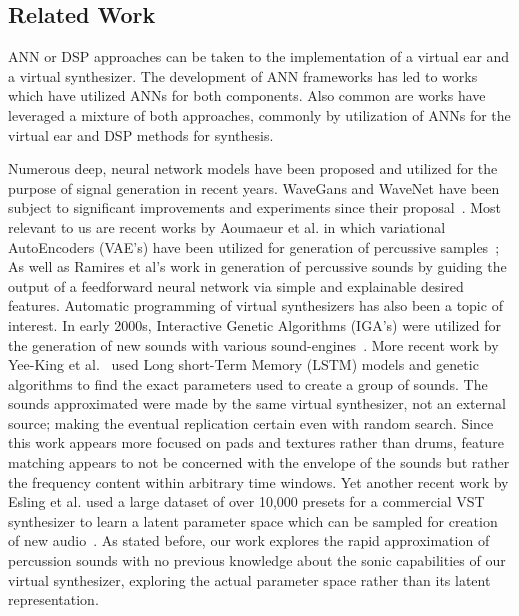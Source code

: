 \documentclass[\main/thesis.tex]{subfiles}
\begin{document}
\subsection{Related Work}
ANN or DSP approaches can be taken to the implementation of a virtual ear and a virtual synthesizer. The development of ANN frameworks has led to works which have utilized ANNs for both components. Also common are works have leveraged a mixture of both approaches, commonly by utilization of ANNs for the virtual ear and DSP methods for synthesis.

\begin{center}
\begin{table}[h*]
\caption{for reference, will delete} %
\end{table}
\end{center}
Numerous deep, neural network models have been proposed and utilized for the purpose of signal generation in recent years. WaveGans and WaveNet have been subject to significant improvements and experiments since their proposal~\cite{nsynth2017,yamamoto2020parallel,oord2017parallel}. Most relevant to us are recent works by Aoumaeur et al. in which variational AutoEncoders (VAE's) have been utilized for generation of percussive samples~\cite{aouameur2019neural}; As well as Ramires et al's work in generation of percussive sounds by guiding the output of a feedforward neural network via simple and explainable desired features. 
Automatic programming of virtual synthesizers has also been a topic of interest. In early 2000s, Interactive Genetic Algorithms (IGA's) were utilized for the generation of new sounds with various sound-engines~\cite{johnson1999exploring,dahlstedt2001creating}. More recent work by Yee-King et al.~\cite{yee2018automatic} used Long short-Term Memory (LSTM) models and genetic algorithms to find the exact parameters used to create a group of sounds. The sounds approximated were made by the same virtual synthesizer, not an external source; making the eventual replication certain even with random search. Since this work appears more focused on pads and textures rather than drums, feature matching appears to not be concerned with the envelope of the sounds but rather the frequency content within arbitrary time windows. Yet another recent work by Esling et al. used a large dataset of over 10,000 presets for a commercial VST synthesizer to learn a latent parameter space which can be sampled for creation of new audio~\cite{esling2019universal}. As stated before, our work explores the rapid approximation of percussion sounds with no previous knowledge about the sonic capabilities of our virtual synthesizer, exploring the actual parameter space rather than its latent representation.

 
\end{document}

